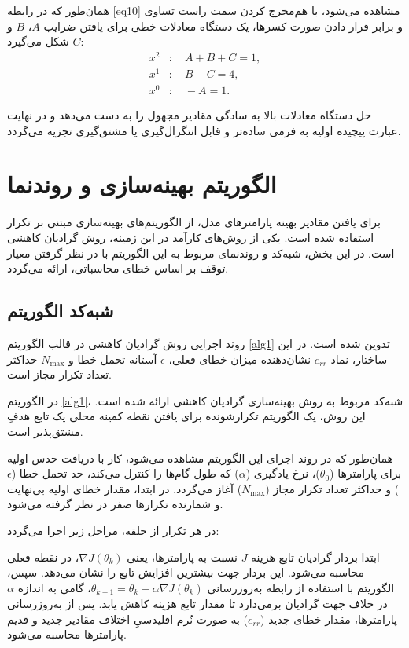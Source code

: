 همان‌طور که در رابطه \eqref{eq10} مشاهده می‌شود، با هم‌مخرج کردن سمت راست تساوی و برابر قرار دادن صورت کسرها، یک دستگاه معادلات خطی برای یافتن ضرایب $ A $، $ B $ و $ C $ شکل می‌گیرد:
\begin{align*}
	x^2 &: \quad A + B + C = 1, \\
	x^1 &: \quad B - C = 4, \\
	x^0 &: \quad -A = 1.
\end{align*}


حل دستگاه معادلات بالا به سادگی مقادیر مجهول را به دست می‌دهد و در نهایت عبارت پیچیده اولیه به فرمی ساده‌تر و قابل انتگرال‌گیری یا مشتق‌گیری تجزیه می‌گردد.

\section{الگوریتم بهینه‌سازی و روندنما}\label{sec:2-2}
برای یافتن مقادیر بهینه پارامتر‌‌های مدل، از الگوریتم‌های بهینه‌سازی مبتنی بر تکرار استفاده شده است. یکی از روش‌های کارآمد در این زمینه، روش گرادیان کاهشی است.\cite{ruder2016overview} در این بخش، شبه‌کد و روندنمای مربوط به این الگوریتم با در نظر گرفتن معیار توقف بر اساس خطای محاسباتی، ارائه می‌گردد.

\subsection{شبه‌کد الگوریتم}\label{subsec:2-2-1}
روند اجرایی روش گرادیان کاهشی در قالب الگوریتم \ref{alg1} تدوین شده است. در این ساختار، نماد $ e_{rr} $ نشان‌دهنده میزان خطای فعلی، $ \epsilon $ آستانه تحمل خطا و $ N_{\max} $ حداکثر تعداد تکرار مجاز است.

در الگوریتم \ref{alg1}، شبه‌کد مربوط به روش بهینه‌سازی گرادیان کاهشی ارائه شده است. این روش، یک الگوریتم تکرارشونده برای یافتن نقطه کمینه محلی یک تابع هدفِ مشتق‌پذیر است.

همان‌طور که در روند اجرای این الگوریتم مشاهده می‌شود، کار با دریافت حدس اولیه برای پارامترها ($\theta_0$)، نرخ یادگیری ($\alpha$) که طول گام‌ها را کنترل می‌کند، حد تحمل خطا ($\epsilon$) و حداکثر تعداد تکرار مجاز ($N_{\max}$) آغاز می‌گردد. در ابتدا، مقدار خطای اولیه بی‌نهایت و شمارنده تکرارها صفر در نظر گرفته می‌شود.

در هر تکرار از حلقه، مراحل زیر اجرا می‌گردد:

ابتدا بردار گرادیان تابع هزینه $J$ نسبت به پارامتر‌ها، یعنی $\nabla J(\theta_k)$، در نقطه فعلی محاسبه می‌شود. این بردار جهت بیشترین افزایش تابع را نشان می‌دهد. سپس، الگوریتم با استفاده از رابطه به‌روزرسانی $\theta_{k+1} = \theta_k - \alpha \nabla J(\theta_k)$، گامی به اندازه $\alpha$ در خلاف جهت گرادیان برمی‌دارد تا مقدار تابع هزینه کاهش یابد. پس از به‌روزرسانی پارامترها، مقدار خطای جدید ($e_{rr}$) به صورت نُرم اقلیدسیِ اختلاف مقادیر جدید و قدیم پارامتر‌ها محاسبه می‌شود.

